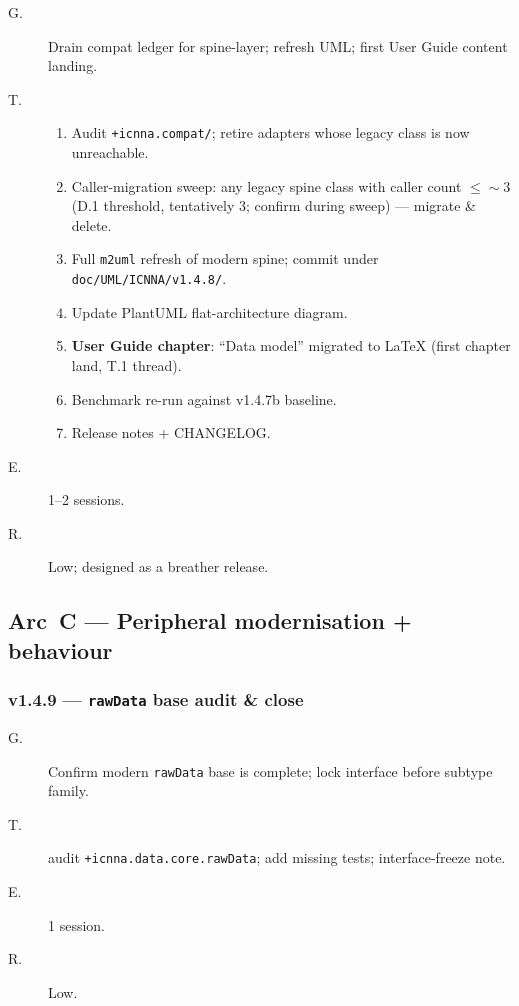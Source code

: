 \documentclass[11pt,a4paper]{article}
\begin{document}
\begin{description}
    \item[G.] Drain compat ledger for spine-layer; refresh UML; first User Guide content landing.
    \item[T.]
        \begin{enumerate}[nosep]
            \item Audit \texttt{+icnna.compat/}; retire adapters whose legacy class is now unreachable.
            \item Caller-migration sweep: any legacy spine class with caller count $\leq \sim 3$ (D.1 threshold, tentatively 3; confirm during sweep) --- migrate \& delete.
            \item Full \texttt{m2uml} refresh of modern spine; commit under \texttt{doc/UML/ICNNA/v1.4.8/}.
            \item Update PlantUML flat-architecture diagram.
            \item \textbf{User Guide chapter}: ``Data model'' migrated to LaTeX (first chapter land, T.1 thread).
            \item Benchmark re-run against v1.4.7b baseline.
            \item Release notes + CHANGELOG.
        \end{enumerate}
    \item[E.] 1--2 sessions.
    \item[R.] Low; designed as a breather release.
\end{description}

\subsection{Arc~C --- Peripheral modernisation + behaviour}

\subsubsection*{v1.4.9 --- \texttt{rawData} base audit \& close}

\begin{description}
    \item[G.] Confirm modern \texttt{rawData} base is complete; lock interface before subtype family.
    \item[T.] audit \texttt{+icnna.data.core.rawData}; add missing tests; interface-freeze note.
    \item[E.] 1 session.
    \item[R.] Low.
\end{description}
\end{document}
